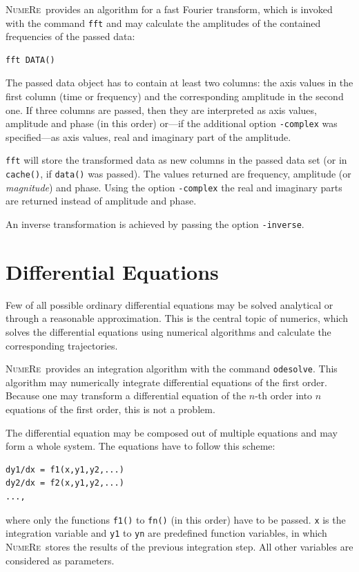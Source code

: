 \documentclass[DIV=14,headsepline,footsepline]{scrbook}
\newcommand{\NR}{\textsc{Nu\-me\-Re}}
\begin{document}
				\NR\ provides an algorithm for a fast Fourier transform, which is invoked with the command \lstinline+fft+ and may calculate the amplitudes of the contained frequencies of the passed data:
				\begin{lstlisting}
fft DATA()
				\end{lstlisting}
				The passed data object has to contain at least two columns: the axis values in the first column (time or frequency) and the corresponding amplitude in the second one. If three columns are passed, then they are interpreted as axis values, amplitude and phase (in this order) or---if the additional option \lstinline+-complex+ was specified---as axis values, real and imaginary part of the amplitude.
				
				\lstinline+fft+ will store the transformed data as new columns in the passed data set (or in \lstinline+cache()+, if \lstinline+data()+ was passed). The values returned are frequency, amplitude (or \emph{magnitude}) and phase. Using the option \lstinline+-complex+ the real and imaginary parts are returned instead of amplitude and phase.
				
				An inverse transformation is achieved by passing the option \lstinline+-inverse+.
				
			\section{Differential Equations}
				Few of all possible ordinary differential equations may be solved analytical or through a reasonable approximation. This is the central topic of numerics, which solves the differential equations using numerical algorithms and calculate the corresponding trajectories.
				
				\NR\ provides an integration algorithm with the command \lstinline+odesolve+. This algorithm may numerically integrate differential equations of the first order. Because one may transform a differential equation of the $n$-th order into $n$ equations of the first order, this is not a problem.
				
				The differential equation may be composed out of multiple equations and may form a whole system. The equations have to follow this scheme:
				\begin{lstlisting}
dy1/dx = f1(x,y1,y2,...)
dy2/dx = f2(x,y1,y2,...)
...,				
				\end{lstlisting}
				where only the functions \lstinline+f1()+ to \lstinline+fn()+ (in this order) have to be passed. \lstinline+x+ is the integration variable and \lstinline+y1+ to \lstinline+yn+ are predefined function variables, in which \NR\ stores the results of the previous integration step. All other variables are considered as parameters.
	
\end{document}
